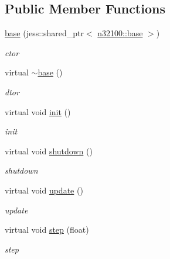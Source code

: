 \subsection*{Public Member Functions}
\begin{DoxyCompactItemize}
\item 
\hyperlink{classnebula_1_1content_1_1actor_1_1admin_1_1base_a9f4825b76ce7cdfe0305835f57d1b328}{base} (jess::shared\_\-ptr$<$ \hyperlink{classnebula_1_1content_1_1scene_1_1admin_1_1base}{n32100::base} $>$)
\begin{DoxyCompactList}\small\item\em ctor \item\end{DoxyCompactList}\item 
virtual \hyperlink{classnebula_1_1content_1_1actor_1_1admin_1_1base_abaf69103377ea0ece77addee5901911a}{$\sim$base} ()
\begin{DoxyCompactList}\small\item\em dtor \item\end{DoxyCompactList}\item 
virtual void \hyperlink{classnebula_1_1content_1_1actor_1_1admin_1_1base_ab7aac539b0e1e06102bbb4b572d529cd}{init} ()
\begin{DoxyCompactList}\small\item\em init \item\end{DoxyCompactList}\item 
virtual void \hyperlink{classnebula_1_1content_1_1actor_1_1admin_1_1base_a5f8943404407602a6757d3ab448d4a75}{shutdown} ()
\begin{DoxyCompactList}\small\item\em shutdown \item\end{DoxyCompactList}\item 
virtual void \hyperlink{classnebula_1_1content_1_1actor_1_1admin_1_1base_a1401d047ad4b2459a047644da275cebf}{update} ()
\begin{DoxyCompactList}\small\item\em update \item\end{DoxyCompactList}\item 
virtual void \hyperlink{classnebula_1_1content_1_1actor_1_1admin_1_1base_ac66cc3aa153fa2d6e45f1195d2027052}{step} (float)
\begin{DoxyCompactList}\small\item\em step \item\end{DoxyCompactList}\item 

\end{DoxyCompactItemize}
